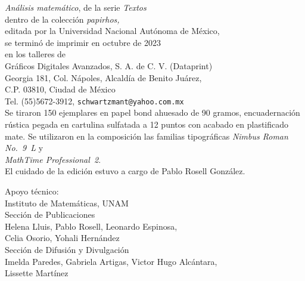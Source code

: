 \documentclass[10pt,pagesize]{scrbook}
\numberwithin{equation}{chapter}
\begin{document}
\newcommand{\at}{\makeatletter @\makeatother}
\pagestyle{empty}
\null\vfill
\begin{center}
\footnotesize
  \parbox{.6\textwidth}{\centering 
      \emph{Análisis matemático},      
        de la serie \emph{Textos} \\ dentro de la 
      colección \emph{papirhos,}\\ editada por la Universidad Nacional
      Autónoma de México,\\ se terminó de imprimir en
      octubre de 2023 \\ en los talleres de \\
       Gráficos Digitales Avanzados, S. A. de C. V. (Dataprint)\\
  Georgia 181, Col. Nápoles, Alcaldía de Benito Juárez,\\
  C.P. 03810, Ciudad de México\\
  Tel. (55)5672-3912, \texttt{schwartzmant@yahoo.com.mx}\\[5pt]

  
      
      Se tiraron 150 ejemplares
      en papel bond ahuesado de 90 gramos, encuadernación rústica pegada
      en cartulina sulfatada a 12 puntos con
      acabado en plastificado mate. Se 
      utilizaron en la composición 
      las familias tipográficas 
      \emph{Nimbus Roman No.~9~L} y\\ 
      \emph{MathTime Professional~2}. \\
 El cuidado de la edición estuvo a cargo de
      Pablo Rosell González.
      \vspace*{3ex}

      Apoyo técnico:\\[5pt]
      Instituto de Matemáticas, UNAM\\[5pt]
Sección de Publicaciones\\
Helena Lluis, Pablo Rosell, Leonardo Espinosa,\\ 
Celia Osorio, Yohali Hernández\\[5pt]
Sección de Difusión y Divulgación\\
Imelda Paredes, Gabriela Artigas, Victor Hugo Alcántara,\\ Lissette Martínez}
\end{center}
\vspace*{2cm}
\vfill
\end{document}
